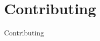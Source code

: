 \documentclass{tufte-book} %
\makeatletter
\let\origappendix\appendix%
\renewcommand{\appendix}{%
  \origappendix%
  \titlecontents{chapter}%
    [0em] %
    {\vspace{1.5\baselineskip}\begin{fullwidth}\LARGE\rmfamily\itshape} %
    {\hspace*{0em}\appendixname~\thecontentslabel: } %
    {\hspace*{0em}} %
    {\rmfamily\upshape\qquad\thecontentspage} %
    [\end{fullwidth}] %
  \titleformat{\chapter}%
    [display]%
    {\relax\ifthenelse{\NOT\boolean{@tufte@symmetric}}{\begin{fullwidth}}{}}%
    {\itshape\huge Appendix~\thechapter}%
    {0pt}%
    {\huge\rmfamily\itshape}%
    [\ifthenelse{\NOT\boolean{@tufte@symmetric}}{\end{fullwidth}}{}]%
  \setcounter{tocdepth}{1}
  \setcounter{secnumdepth}{1}
}
\makeatother
\begin{document}

\chapter{Contributing}
\renewcommand{\FiguresPath}{./Contributing/figures}
{Contributing}







{}





\printindex %
\end{document}
